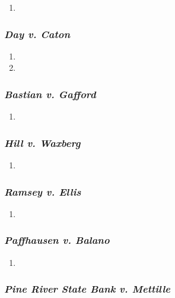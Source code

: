 \begin{enumerate}
    \item %
\end{enumerate}

\subsubsection{\emph{Day v. Caton}}

\begin{enumerate}
    \item %
    \item %
\end{enumerate}

\subsubsection{\emph{Bastian v. Gafford}}

\begin{enumerate}
    \item %
\end{enumerate}

\subsubsection{\emph{Hill v. Waxberg}}

\begin{enumerate}
    \item %
\end{enumerate}

\subsubsection{\emph{Ramsey v. Ellis}}

\begin{enumerate}
    \item %
\end{enumerate}

\subsubsection{\emph{Paffhausen v. Balano}}

\begin{enumerate}
    \item %
\end{enumerate}

\subsubsection{\emph{Pine River State Bank v. Mettille}}

